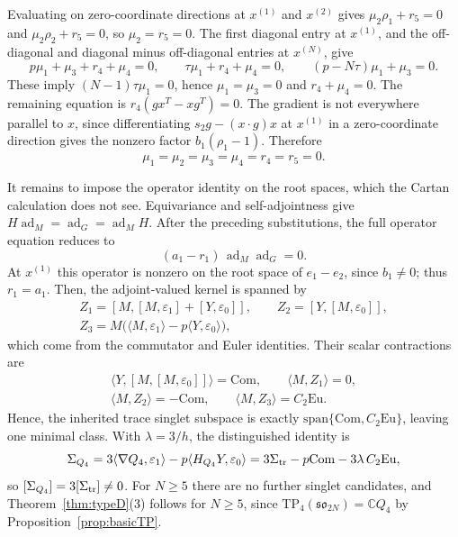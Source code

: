 \documentclass[10pt,reqno]{amsart}
\numberwithin{equation}{section}
\theoremstyle{plain}
\theoremstyle{definition}
\DeclareMathOperator{\ad}{ad}
\newcommand{\Eu}{\mathrm{Eu}}
\newcommand{\TP}{\mathrm{TP}}
\newcommand{\ip}[2]{\langle #1, #2\rangle}
\begin{document}
Evaluating on zero-coordinate directions at $x^{(1)}$ and $x^{(2)}$ gives $\mu_2\rho_1+r_5=0$ and $\mu_2\rho_2+r_5=0$, so $\mu_2=r_5=0$. The first diagonal entry at $x^{(1)}$, and the off-diagonal and diagonal minus off-diagonal entries at $x^{(N)}$, give
\begin{equation*}
	p\mu_1+\mu_3+r_4+\mu_4=0,\qquad \tau\mu_1+r_4+\mu_4=0,\qquad (p-N\tau)\mu_1+\mu_3=0 .
\end{equation*}
These imply $(N-1)\tau\mu_1=0$, hence $\mu_1=\mu_3=0$ and $r_4+\mu_4=0$. The remaining equation is $r_4(gx^T-xg^T)=0$. The gradient is not everywhere parallel to $x$, since differentiating $s_2g-(x\cdot g)x$ at $x^{(1)}$ in a zero-coordinate direction gives the nonzero factor $b_1(\rho_1-1)$. Therefore
\begin{equation*}
	\mu_1=\mu_2=\mu_3=\mu_4=r_4=r_5=0 .
\end{equation*}

It remains to impose the operator identity on the root spaces, which the Cartan calculation does not see. Equivariance and self-adjointness give $H\ad_M=\ad_G=\ad_MH$. After the preceding substitutions, the full operator equation reduces to
\begin{equation*}
	(a_1-r_1)\,\ad_M\ad_G=0 .
\end{equation*}
At $x^{(1)}$ this operator is nonzero on the root space of $e_1-e_2$, since $b_1\neq0$; thus $r_1=a_1$. Then, the adjoint-valued kernel is spanned by
\begin{equation*}
\begin{gathered}
	Z_1=[M,[M,\varepsilon_1]+[Y,\varepsilon_0]],\qquad Z_2=[Y,[M,\varepsilon_0]],\\
	Z_3=M\big(\ip M{\varepsilon_1}-p\ip Y{\varepsilon_0}\big),
\end{gathered}
\end{equation*}
which come from the commutator and Euler identities. Their scalar contractions are
\begin{equation*}
\begin{gathered}
	\ip Y{[M,[M,\varepsilon_0]]}=\mathrm{Com},\qquad \ip M{Z_1}=0,\\
	\ip M{Z_2}=-\mathrm{Com},\qquad \ip M{Z_3}=C_2\Eu .
\end{gathered}
\end{equation*}
Hence, the inherited trace singlet subspace is exactly $\mathrm{span}\{\mathrm{Com},C_2\Eu\}$, leaving one minimal class. With $\lambda=3/h$, the distinguished identity is
\begin{equation}\label{eq:SigmaQ4decomp}
	\Sigma_{Q_4}=3\ip{\nabla Q_4}{\varepsilon_1}-p\ip{H_{Q_4}Y}{\varepsilon_0}=3\Sigma_{\rm tr}-p\mathrm{Com}-3\lambda\,C_2\Eu ,
\end{equation}
so $[\Sigma_{Q_4}]=3[\Sigma_{\rm tr}]\neq0$. For $N\ge5$ there are no further singlet candidates, and Theorem~\ref{thm:typeD}(3) follows for $N\ge5$, since $\TP_4(\mathfrak{so}_{2N})=\mathbb{C} Q_4$ by Proposition~\ref{prop:basicTP}.
\end{document}
